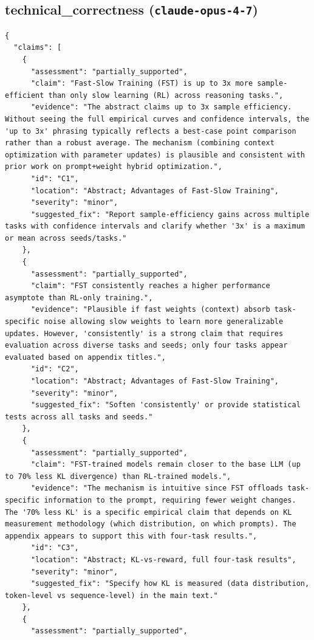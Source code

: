 \documentclass[11pt]{article}
\begin{document}
\subsection*{technical_correctness (\texttt{claude-opus-4-7})}
\begin{verbatim}
{
  "claims": [
    {
      "assessment": "partially_supported",
      "claim": "Fast-Slow Training (FST) is up to 3x more sample-efficient than only slow learning (RL) across reasoning tasks.",
      "evidence": "The abstract claims up to 3x sample efficiency. Without seeing the full empirical curves and confidence intervals, the 'up to 3x' phrasing typically reflects a best-case point comparison rather than a robust average. The mechanism (combining context optimization with parameter updates) is plausible and consistent with prior work on prompt+weight hybrid optimization.",
      "id": "C1",
      "location": "Abstract; Advantages of Fast-Slow Training",
      "severity": "minor",
      "suggested_fix": "Report sample-efficiency gains across multiple tasks with confidence intervals and clarify whether '3x' is a maximum or mean across seeds/tasks."
    },
    {
      "assessment": "partially_supported",
      "claim": "FST consistently reaches a higher performance asymptote than RL-only training.",
      "evidence": "Plausible if fast weights (context) absorb task-specific noise allowing slow weights to learn more generalizable updates. However, 'consistently' is a strong claim that requires evaluation across diverse tasks and seeds; only four tasks appear evaluated based on appendix titles.",
      "id": "C2",
      "location": "Abstract; Advantages of Fast-Slow Training",
      "severity": "minor",
      "suggested_fix": "Soften 'consistently' or provide statistical tests across all tasks and seeds."
    },
    {
      "assessment": "partially_supported",
      "claim": "FST-trained models remain closer to the base LLM (up to 70% less KL divergence) than RL-trained models.",
      "evidence": "The mechanism is intuitive since FST offloads task-specific information to the prompt, requiring fewer weight changes. The '70% less KL' is a specific empirical claim that depends on KL measurement methodology (which distribution, on which prompts). The appendix appears to support this with four-task results.",
      "id": "C3",
      "location": "Abstract; KL-vs-reward, full four-task results",
      "severity": "minor",
      "suggested_fix": "Specify how KL is measured (data distribution, token-level vs sequence-level) in the main text."
    },
    {
      "assessment": "partially_supported",

\end{verbatim}
\end{document}
